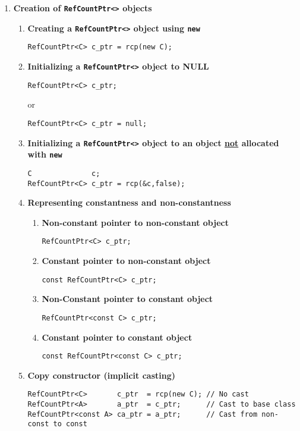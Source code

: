 \documentclass[pdf,ps2pdf,11pt]{SANDreport}
\begin{document}
\begin{enumerate}

\item {\bf Creation of \texttt{RefCountPtr<>} objects}

\begin{enumerate}

\item {\bf Creating a \texttt{RefCountPtr<>} object using \texttt{new}}
\label{rcpqs:apdx:qs:new}
%
 {\small\begin{verbatim}
RefCountPtr<C> c_ptr = rcp(new C);
\end{verbatim}}
%
\item {\bf Initializing a \texttt{RefCountPtr<>} object to NULL}
\label{rcpqs:apdx:qs:null}
%
{\small\begin{verbatim}
RefCountPtr<C> c_ptr;
\end{verbatim}}
or
{\small\begin{verbatim}
RefCountPtr<C> c_ptr = null;
\end{verbatim}}
%
\item {\bf Initializing a \texttt{RefCountPtr<>} object to an object
       \underline{not} allocated with \texttt{new}}
\label{rcpqs:apdx:qs:not-new}
%
{\small\begin{verbatim}
C              c;
RefCountPtr<C> c_ptr = rcp(&c,false);
\end{verbatim}}
%
%
\item {\bf Representing constantness and non-constantness}
%
\begin{enumerate}
%
\item {\bf Non-constant pointer to non-constant object }
{\small\begin{verbatim}
RefCountPtr<C> c_ptr;
\end{verbatim}}
%
\item {\bf Constant pointer to non-constant object }
{\small\begin{verbatim}
const RefCountPtr<C> c_ptr;
\end{verbatim}}
%
\item {\bf Non-Constant pointer to constant object }
{\small\begin{verbatim}
RefCountPtr<const C> c_ptr;
\end{verbatim}}
%
\item {\bf Constant pointer to constant object }
{\small\begin{verbatim}
const RefCountPtr<const C> c_ptr;
\end{verbatim}}
%
\end{enumerate}
%
\item {\bf Copy constructor (implicit casting)}
%
{\small\begin{verbatim}
RefCountPtr<C>       c_ptr  = rcp(new C); // No cast
RefCountPtr<A>       a_ptr  = c_ptr;      // Cast to base class
RefCountPtr<const A> ca_ptr = a_ptr;      // Cast from non-const to const
\end{verbatim}}
%
\end{enumerate}


\end{enumerate}
\end{document}
